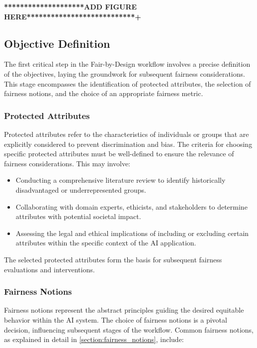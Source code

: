 \textbf{********************ADD FIGURE HERE***************************+}

\subsection{Objective Definition}
\label{subsection:objective}

The first critical step in the Fair-by-Design workflow involves a precise definition of the objectives, laying the groundwork for subsequent fairness considerations. This stage encompasses the identification of protected attributes, the selection of fairness notions, and the choice of an appropriate fairness metric.

\subsubsection{Protected Attributes}

Protected attributes refer to the characteristics of individuals or groups that are explicitly considered to prevent discrimination and bias. The criteria for choosing specific protected attributes must be well-defined to ensure the relevance of fairness considerations. This may involve:

\begin{itemize}

    \item Conducting a comprehensive literature review to identify historically disadvantaged or underrepresented groups.
    
    \item Collaborating with domain experts, ethicists, and stakeholders to determine attributes with potential societal impact.
    
    \item Assessing the legal and ethical implications of including or excluding certain attributes within the specific context of the AI application.

\end{itemize}

The selected protected attributes form the basis for subsequent fairness evaluations and interventions.

\subsubsection{Fairness Notions}

Fairness notions represent the abstract principles guiding the desired equitable behavior within the AI system. The choice of fairness notions is a pivotal decision, influencing subsequent stages of the workflow. Common fairness notions, as explained in detail in \cref{section:fairness_notions}, include:

